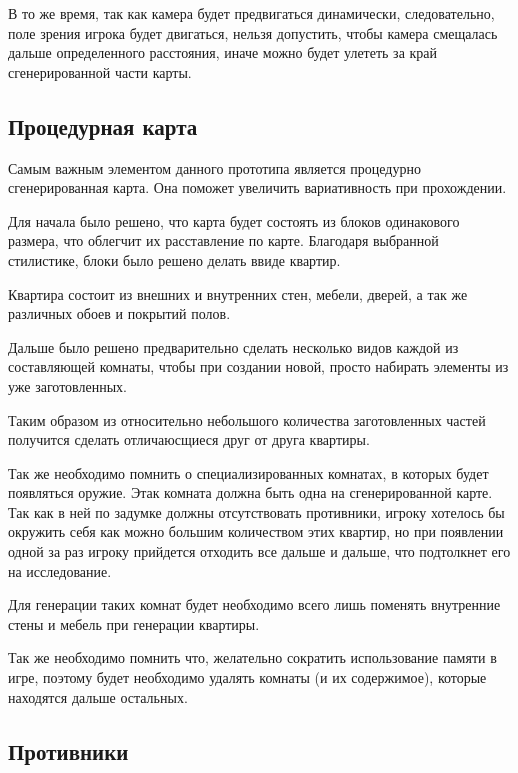 \documentclass[14pt, titlepage,fleqn,a4paper]{extarticle}
\begin{document}
	В то же время, так как камера будет предвигаться динамически, следовательно, поле зрения игрока будет двигаться, нельзя допустить, чтобы камера смещалась дальше определенного расстояния, иначе можно будет улететь за край сгенерированной части карты.
	
	\newpage
	\subsection*{Процедурная карта}
	
	Самым важным элементом данного прототипа является процедурно сгенерированная карта. Она поможет увеличить вариативность при прохождении.
	
	Для начала было решено, что карта будет состоять из блоков одинакового размера, что облегчит их расставление по карте. Благодаря выбранной стилистике, блоки было решено делать ввиде квартир.
	
	Квартира состоит из внешних и внутренних стен, мебели, дверей, а так же различных обоев и покрытий полов.
	
	Дальше было решено предварительно сделать несколько видов каждой из составляющей комнаты, чтобы при создании новой, просто набирать элементы из уже заготовленных.
	
	Таким образом из относительно небольшого количества заготовленных частей получится сделать отличаюсщиеся друг от друга квартиры.
	
	Так же необходимо помнить о специализированных комнатах, в которых будет появляться оружие.
	Этак комната должна быть одна на сгенерированной карте. Так как в ней по задумке должны отсутствовать противники, игроку хотелось бы окружить себя как можно большим количеством этих квартир, но при появлении одной за раз игроку прийдется отходить все дальше и дальше, что подтолкнет его на исследование.
	
	Для генерации таких комнат будет необходимо всего лишь поменять внутренние стены и мебель при генерации квартиры.
	
	Так же необходимо помнить что, желательно сократить использование памяти в игре, поэтому будет необходимо удалять комнаты (и их содержимое), которые находятся дальше остальных.
	\newpage
	\subsection*{Противники}
	
\end{document}
